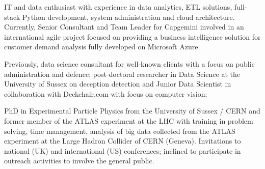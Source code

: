 
IT and data enthusiast with experience in data analytics, ETL solutions, full-stack Python development, system administration and cloud architecture. Currently, Senior Consultant and Team Leader for Capgemini involved in an international agile project focused on providing a business intelligence solution for customer demand analysis fully developed on Microsoft Azure.

Previously, data science consultant for well-known clients with a focus on public administration and defence; post-doctoral researcher in Data Science at the University of Sussex on deception detection and Junior Data Scientist in collaboration with Deckchair.com with focus on computer vision;

PhD in Experimental Particle Physics from the University of Sussex / CERN and former member of the ATLAS experiment at the LHC with training in problem solving, time management, analysis of big data collected from the ATLAS experiment at the Large Hadron Collider of CERN (Geneva). Invitations to national (UK) and international (US) conferences; inclined to participate in outreach activities to involve the general public.